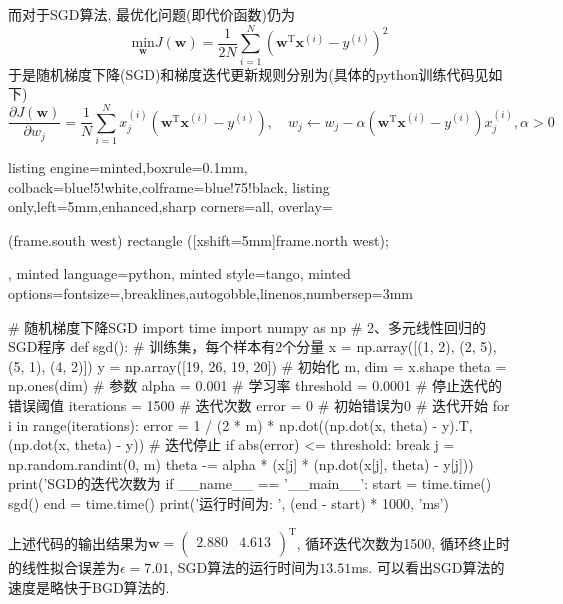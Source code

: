 \documentclass{article}
\begin{document}
\begin{homeworkProblem}
	而对于SGD算法, 最优化问题(即代价函数)仍为$$\displaystyle \underset{\boldsymbol{w}}{\text{min}}J\left( \boldsymbol{w} \right) = \frac{1}{2N} \sum_{i=1}^N{\left( \boldsymbol{w}^{\text{T}}\boldsymbol{x}^{\left( i \right)}-y^{\left( i \right)} \right) ^2}	$$
	于是随机梯度下降(SGD)和梯度迭代更新规则分别为(具体的python训练代码见如下)
	$$
	\frac{\partial J\left( \boldsymbol{w} \right)}{\partial w_j}=\frac{1}{N}\sum_{i=1}^N{x_{j}^{\left( i \right)}\left( \boldsymbol{w}^{\text{T}}\boldsymbol{x}^{\left( i \right)}-y^{\left( i \right)} \right)},\quad w_j\gets w_j-\alpha \left( \boldsymbol{w}^{\text{T}}\boldsymbol{x}^{\left( i \right)}-y^{\left( i \right)} \right) x_{j}^{\left( i \right)},\alpha >0
	$$
\begin{tcblisting}{listing engine=minted,boxrule=0.1mm,
colback=blue!5!white,colframe=blue!75!black,
listing only,left=5mm,enhanced,sharp corners=all,
overlay={\begin{tcbclipinterior} (frame.south west)
rectangle ([xshift=5mm]frame.north west);\end{tcbclipinterior}},
minted language=python,
minted style=tango,
minted options={fontsize=\normalsize,breaklines,autogobble,linenos,numbersep=3mm}}
# 随机梯度下降SGD
import time
import numpy as np
# 2、多元线性回归的SGD程序
def sgd():
    # 训练集，每个样本有2个分量
    x = np.array([(1, 2), (2, 5), (5, 1), (4, 2)])
    y = np.array([19, 26, 19, 20])
    # 初始化
    m, dim = x.shape
    theta = np.ones(dim)  # 参数
    alpha = 0.001  # 学习率
    threshold = 0.0001  # 停止迭代的错误阈值
    iterations = 1500  # 迭代次数
    error = 0  # 初始错误为0
    # 迭代开始
    for i in range(iterations):
        error = 1 / (2 * m) * np.dot((np.dot(x, theta) - y).T, (np.dot(x, theta) - y))
        # 迭代停止
        if abs(error) <= threshold:
            break
        j = np.random.randint(0, m)
        theta -= alpha * (x[j] * (np.dot(x[j], theta) - y[j]))
    print('SGD的迭代次数为%
if __name__ == '__main__':
    start = time.time()
    sgd()
    end = time.time()
    print('运行时间为: ', (end - start) * 1000, 'ms')
\end{tcblisting}
	上述代码的输出结果为$\boldsymbol{w}=\left( \begin{matrix}
	2.880&		4.613\\
	\end{matrix} \right) ^{\text{T}}$, 循环迭代次数为1500, 循环终止时的线性拟合误差为$\epsilon = 7.01$, SGD算法的运行时间为$13.51$ms. 可以看出SGD算法的速度是略快于BGD算法的.
\end{homeworkProblem}
\end{document}
